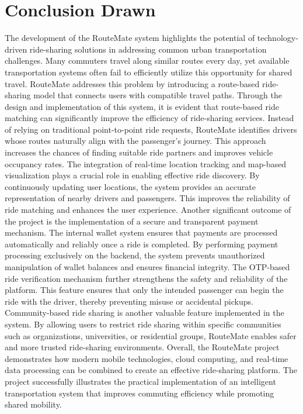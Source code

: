 \documentclass[10pt,a4paper]{report}
\begin{document}
\section{Conclusion Drawn}
\justify\large The development of the RouteMate system highlights the potential of technology-driven ride-sharing solutions in addressing common urban transportation challenges. Many commuters travel along similar routes every day, yet available transportation systems often fail to efficiently utilize this opportunity for shared travel. RouteMate addresses this problem by introducing a route-based ride-sharing model that connects users with compatible travel paths.
\justify\large Through the design and implementation of this system, it is evident that route-based ride matching can significantly improve the efficiency of ride-sharing services. Instead of relying on traditional point-to-point ride requests, RouteMate identifies drivers whose routes naturally align with the passenger’s journey. This approach increases the chances of finding suitable ride partners and improves vehicle occupancy rates.
\justify\large The integration of real-time location tracking and map-based visualization plays a crucial role in enabling effective ride discovery. By continuously updating user locations, the system provides an accurate representation of nearby drivers and passengers. This improves the reliability of ride matching and enhances the user experience.
\justify\large Another significant outcome of the project is the implementation of a secure and transparent payment mechanism. The internal wallet system ensures that payments are processed automatically and reliably once a ride is completed. By performing payment processing exclusively on the backend, the system prevents unauthorized manipulation of wallet balances and ensures financial integrity.
\justify\large The OTP-based ride verification mechanism further strengthens the safety and reliability of the platform. This feature ensures that only the intended passenger can begin the ride with the driver, thereby preventing misuse or accidental pickups.
\justify\large Community-based ride sharing is another valuable feature implemented in the system. By allowing users to restrict ride sharing within specific communities such as organizations, universities, or residential groups, RouteMate enables safer and more trusted ride-sharing environments.
\justify\large Overall, the RouteMate project demonstrates how modern mobile technologies, cloud computing, and real-time data processing can be combined to create an effective ride-sharing platform. The project successfully illustrates the practical implementation of an intelligent transportation system that improves commuting efficiency while promoting shared mobility.
\end{document}
